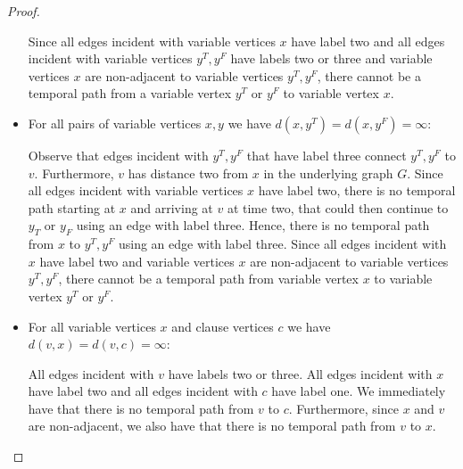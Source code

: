 \documentclass[11pt,a4paper]{article}
\theoremstyle{remark}
\theoremstyle{definition}
\begin{document}
\begin{proof}
\begin{itemize}
Since all edges incident with variable vertices $x$ have label two and all edges incident with variable vertices $y^T, y^F$ have labels two or three and variable vertices $x$ are non-adjacent to variable vertices $y^T,y^F$, there cannot be a temporal path from a variable vertex $y^T$ or $y^F$ to variable vertex $x$.
\item For all pairs of variable vertices $x,y$ we have $d(x,y^T)=d(x,y^F)=\infty$:

Observe that edges incident with $y^T, y^F$ that have label three connect $y^T, y^F$ to $v$. Furthermore, $v$ has distance two from $x$ in the underlying graph $G$. Since all edges incident with variable vertices $x$ have label two, there is no temporal path starting at $x$ and arriving at $v$ at time two, that could then continue to $y_T$ or $y_F$ using an edge with label three. Hence, there is no temporal path from $x$ to $y^T, y^F$ using an edge with label three. Since all edges incident with $x$ have label two and variable vertices $x$ are non-adjacent to variable vertices $y^T,y^F$, there cannot be a temporal path from variable vertex $x$ to variable vertex $y^T$ or $y^F$.
\item For all variable vertices $x$ and clause vertices $c$ we have $d(v,x)=d(v,c)=\infty$:

All edges incident with $v$ have labels two or three. All edges incident with $x$ have label two and all edges incident with $c$ have label one. We immediately have that there is no temporal path from $v$ to $c$. Furthermore, since $x$ and $v$ are non-adjacent, we also have that there is no temporal path from $v$ to $x$.
\end{itemize}
%
\begin{figure}[h]
	\noindent
\end{figure}
\end{proof}
\end{document}

